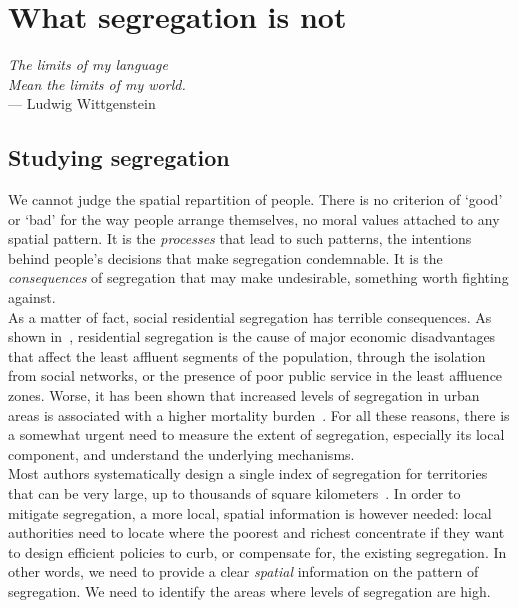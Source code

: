 \chapter{What segregation is not}
\label{chap:segregation_introduction}

\begin{flushright}{\slshape    
The limits of my language\\
Mean the limits of my world.} \\ \medskip
--- Ludwig Wittgenstein~\cite{Wittgenstein:1998}
\end{flushright}


\bigskip


\newcommand{\E}{\mathrm{E}}
\newcommand{\Var}{\mathrm{Var}}

\section{Studying segregation}
\label{sec:studying_segregation}


We cannot judge the spatial repartition of people. There is no criterion of
`good' or `bad' for the way people arrange themselves, no moral values attached
to any spatial pattern. It is the \emph{processes} that lead to such patterns,
the intentions behind people's decisions that make segregation condemnable. It
is the \emph{consequences} of segregation that may make undesirable, something
worth fighting against.\\

As a matter of fact, social residential segregation has terrible consequences.
As shown in~\cite{Massey:1993}, residential segregation is the cause of major
economic disadvantages that affect the least affluent segments of the
population, through the isolation from social networks, or the presence of poor
public service in the least affluence zones. Worse, it has been shown that
increased levels of segregation in urban areas is associated with a higher
mortality burden~\cite{Lobmayer:2002}. For all these reasons, there is a
somewhat urgent need to measure the extent of segregation, especially its local
component, and understand the underlying mechanisms.\\

Most authors systematically design a single index of segregation for
territories that can be very large, up to thousands of square
kilometers~\cite{Apparicio:2000}. In order to mitigate segregation, a more
local, spatial information is however needed: local authorities need to locate
where the poorest and richest concentrate if they want to design efficient
policies to curb, or compensate for, the existing segregation. In other words,
we need to provide a clear {\it spatial} information on the pattern of
segregation. We need to identify the areas where levels of segregation are high.

